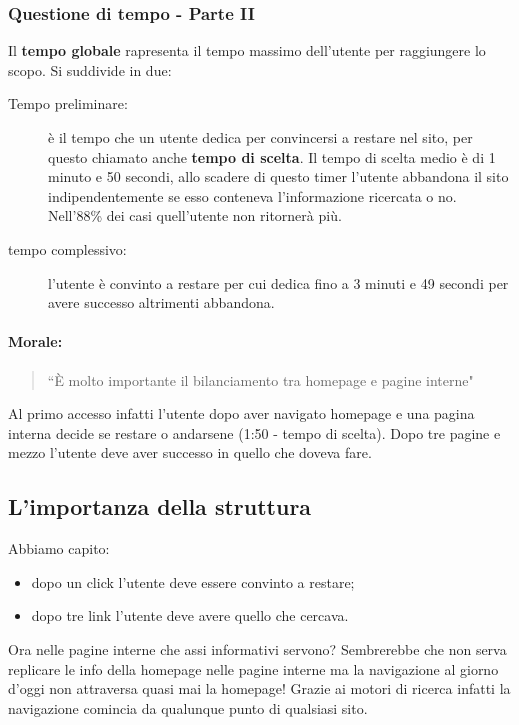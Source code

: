 		\subsubsection{Questione di tempo - Parte II}
			Il \textbf{tempo globale} rapresenta il tempo massimo dell'utente per raggiungere lo scopo. Si suddivide in due:
			\begin{description}
				\item[Tempo preliminare:] è il tempo che un utente dedica per convincersi a restare nel sito, per questo chiamato anche \textbf{tempo di scelta}. Il tempo di scelta medio è di 1 minuto e 50 secondi, allo scadere di questo timer l'utente abbandona il sito indipendentemente se esso conteneva l'informazione ricercata o no. Nell'88\% dei casi quell'utente non ritornerà più.
				\item[tempo complessivo:] l'utente è convinto a restare per cui dedica fino a 3 minuti e 49 secondi per avere successo altrimenti abbandona.
			\end{description}
			
			\paragraph*{Morale:}
			\begin{quote}
				``È molto importante il bilanciamento tra homepage e pagine interne"
			\end{quote}
			Al primo accesso infatti l'utente dopo aver navigato homepage e una pagina interna decide se restare o andarsene (1:50 - tempo di scelta). Dopo tre pagine e mezzo l'utente deve aver successo in quello che doveva fare.
	
	\subsection{L'importanza della struttura}
		Abbiamo capito:
		\begin{itemize}
			\item dopo un click l'utente deve essere convinto a restare;
			\item dopo tre link l'utente deve avere quello che cercava.
		\end{itemize}
		
		Ora nelle pagine interne che assi informativi servono? Sembrerebbe che non serva replicare le info della homepage nelle pagine interne ma la navigazione al giorno d'oggi non attraversa quasi mai la homepage!
		Grazie ai motori di ricerca infatti la navigazione comincia da qualunque punto di qualsiasi sito.
	
